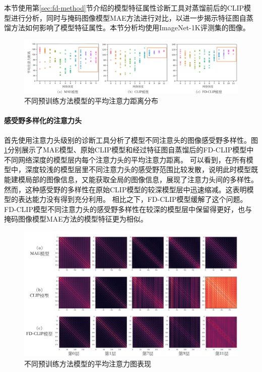 本节使用第\ref{sec:fd-method}节介绍的模型特征属性诊断工具对蒸馏前后的CLIP模型进行分析，同时与掩码图像模型MAE方法进行对比，以进一步揭示特征图自蒸馏方法如何影响了模型特征属性。本节分析均使用ImageNet-1K评测集的图像。
\begin{figure}
  \centering
  \includegraphics[width=1.0\linewidth]{figures/fd-attn-distance.pdf}
  \caption{不同预训练方法模型的平均注意力距离分布}
  \label{fig:fd-attn-distance}
\end{figure}
\paragraph{感受野多样化的注意力头} 首先使用注意力头级别的诊断工具分析了模型不同注意头的图像感受野多样性。图\ref{fig:fd-attn-distance}分别展示了MAE模型、原始CLIP模型和经过特征图自蒸馏后的FD-CLIP模型中不同网络深度的模型层内每个注意力头的平均注意力距离。
可以看到，在所有模型中，深度较浅的模型层里不同注意力头的感受野范围比较发散，说明此时模型既能建模局部的图像信息，又能获取全局的图像信息，展现了注意力头间的多样性。
然而，这种感受野的多样性在原始CLIP模型的较深模型层中迅速缩减。这表明模型的表达能力没有得到充分利用\cite{xie2023revealing}。
相比之下，FD-CLIP模型缓解了这个问题。FD-CLIP模型不同注意力头的感受野多样性在较深的模型层中保留得更好，也与掩码图像模型MAE方法的模型特征更为相似。%

\begin{figure}
  \centering
  \includegraphics[width=1.0\linewidth]{figures/fd-attn-map.pdf}
  \caption{不同预训练方法模型的平均注意力图表现}
  \label{fig:fd-attn-map}
\end{figure}

